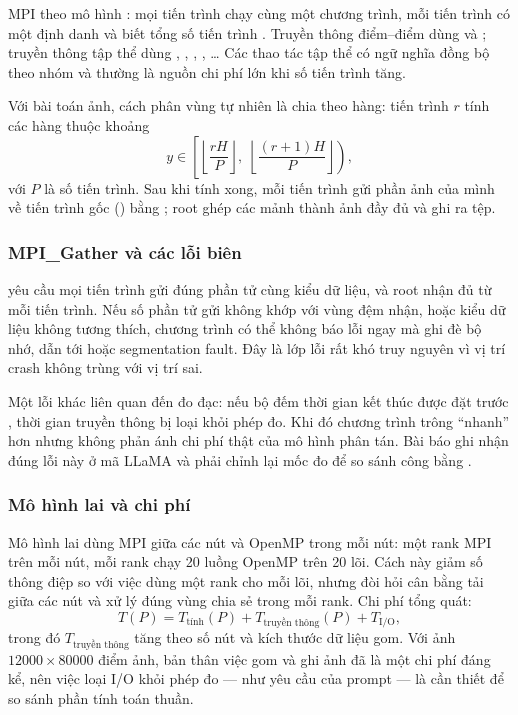 MPI theo mô hình  \cite{gropp1999}: mọi tiến trình chạy cùng
một chương trình, mỗi tiến trình có một định danh  và biết tổng số
tiến trình . Truyền thông điểm--điểm dùng  và
; truyền thông tập thể dùng , ,
, , \ldots{} Các thao tác tập thể có ngữ nghĩa
đồng bộ theo nhóm và thường là nguồn chi phí lớn khi số tiến trình tăng.

Với bài toán ảnh, cách phân vùng tự nhiên là chia theo hàng: tiến trình $r$ tính
các hàng thuộc khoảng
\begin{equation}
  y \in \left[\left\lfloor \frac{rH}{P}\right\rfloor,\;
             \left\lfloor \frac{(r+1)H}{P}\right\rfloor\right),
\end{equation}
với $P$ là số tiến trình. Sau khi tính xong, mỗi tiến trình gửi phần ảnh của mình
về tiến trình gốc () bằng ; root ghép các mảnh thành
ảnh đầy đủ và ghi ra tệp.

\subsubsection{MPI\_Gather và các lỗi biên}

 yêu cầu mọi tiến trình gửi đúng  phần tử cùng
kiểu dữ liệu, và root nhận đủ  từ mỗi tiến trình. Nếu số phần tử
gửi không khớp với vùng đệm nhận, hoặc kiểu dữ liệu không tương thích, chương
trình có thể không báo lỗi ngay mà ghi đè bộ nhớ, dẫn tới  hoặc segmentation fault. Đây là lớp lỗi rất khó truy nguyên vì vị trí
crash không trùng với vị trí sai.

Một lỗi khác liên quan đến đo đạc: nếu bộ đếm thời gian kết thúc được đặt trước
, thời gian truyền thông bị loại khỏi phép đo. Khi đó chương
trình trông “nhanh” hơn nhưng không phản ánh chi phí thật của mô hình phân tán.
Bài báo ghi nhận đúng lỗi này ở mã LLaMA và phải chỉnh lại mốc đo để so sánh công
bằng \cite{diehl2026}.

\subsubsection{Mô hình lai và chi phí}

Mô hình lai dùng MPI giữa các nút và OpenMP trong mỗi nút: một rank MPI trên mỗi
nút, mỗi rank chạy 20 luồng OpenMP trên 20 lõi. Cách này giảm số thông điệp so
với việc dùng một rank cho mỗi lõi, nhưng đòi hỏi cân bằng tải giữa các nút và
xử lý đúng vùng chia sẻ trong mỗi rank. Chi phí tổng quát:
\begin{equation}
  T(P) = T_{\text{tính}}(P) + T_{\text{truyền thông}}(P) + T_{\text{I/O}},
\end{equation}
trong đó $T_{\text{truyền thông}}$ tăng theo số nút và kích thước dữ liệu gom.
Với ảnh $12000\times80000$ điểm ảnh, bản thân việc gom và ghi ảnh đã là một chi
phí đáng kể, nên việc loại I/O khỏi phép đo — như yêu cầu của prompt — là cần
thiết để so sánh phần tính toán thuần.

